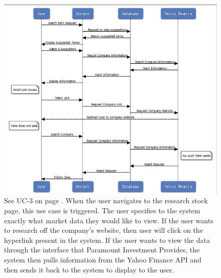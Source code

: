 \begin{figure}
\centering
\includegraphics[width=5.5in]{./img/uc3.png}
\caption{See UC-3 on page \pageref{UC-3}. When the user navigates to the research
stock page, this use case is triggered. The
user specifies to the system exactly what market data they would like to view. If
the user wants to research off the company’s website, then user will click on the
hyperlink present in the system. If the user wants to view the data through the
interface that Paramount Investment Provides, the system then pulls information
from the Yahoo Finance API and then sends it back to the system to display to the
user.}
\end{figure}


